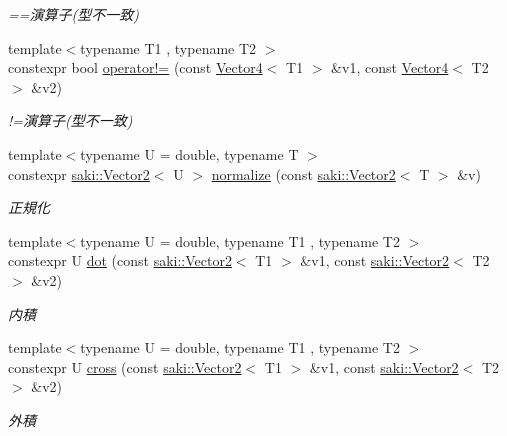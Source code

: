 \begin{DoxyCompactItemize}
\begin{DoxyCompactList}\small\item\em ==演算子(型不一致) \end{DoxyCompactList}\item 
{\footnotesize template$<$typename T1 , typename T2 $>$ }\\constexpr bool \mbox{\hyperlink{namespacesaki_a94fb7c22e19169a09ed778d18bf958e8}{operator!=}} (const \mbox{\hyperlink{classsaki_1_1_vector4}{Vector4}}$<$ T1 $>$ \&v1, const \mbox{\hyperlink{classsaki_1_1_vector4}{Vector4}}$<$ T2 $>$ \&v2)
\begin{DoxyCompactList}\small\item\em !=演算子(型不一致) \end{DoxyCompactList}\item 
{\footnotesize template$<$typename U  = double, typename T $>$ }\\constexpr \mbox{\hyperlink{classsaki_1_1_vector2}{saki\+::\+Vector2}}$<$ U $>$ \mbox{\hyperlink{namespacesaki_a333cfdbbc10458e1e2d59dbba448b19c}{normalize}} (const \mbox{\hyperlink{classsaki_1_1_vector2}{saki\+::\+Vector2}}$<$ T $>$ \&v)
\begin{DoxyCompactList}\small\item\em 正規化 \end{DoxyCompactList}\item 
{\footnotesize template$<$typename U  = double, typename T1 , typename T2 $>$ }\\constexpr U \mbox{\hyperlink{namespacesaki_ab82e30fbfefb8153e8488bd78a163258}{dot}} (const \mbox{\hyperlink{classsaki_1_1_vector2}{saki\+::\+Vector2}}$<$ T1 $>$ \&v1, const \mbox{\hyperlink{classsaki_1_1_vector2}{saki\+::\+Vector2}}$<$ T2 $>$ \&v2)
\begin{DoxyCompactList}\small\item\em 内積 \end{DoxyCompactList}\item 
{\footnotesize template$<$typename U  = double, typename T1 , typename T2 $>$ }\\constexpr U \mbox{\hyperlink{namespacesaki_afafc06ccc85183ee8b08a2cbeded09c8}{cross}} (const \mbox{\hyperlink{classsaki_1_1_vector2}{saki\+::\+Vector2}}$<$ T1 $>$ \&v1, const \mbox{\hyperlink{classsaki_1_1_vector2}{saki\+::\+Vector2}}$<$ T2 $>$ \&v2)
\begin{DoxyCompactList}\small\item\em 外積 \end{DoxyCompactList}\item 

\end{DoxyCompactItemize}
